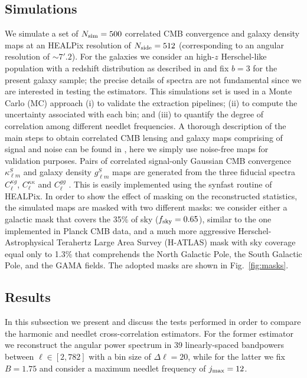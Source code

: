 \documentclass[a4paper,11pt]{article}
\begin{document}
\subsection{Simulations}
\label{sec:sims}
We simulate a set of $N_{\rm sim}=500$ correlated CMB convergence and galaxy density maps at an 
HEALPix resolution of $N_{\rm side} = 512$ (corresponding to an angular resolution of $\sim 7'.2$). 
For the galaxies we consider an high-$z$ Herschel-like 
population with a redshift distribution as described in \cite{Bianchini2016} and fix $b=3$ for the present 
galaxy sample; the precise details of spectra are not fundamental since we are interested in testing the 
estimators. This simulations set is used in a Monte Carlo (MC) 
approach (i) to validate the extraction pipelines; (ii) to compute the uncertainty associated with each bin; 
and (iii) to quantify the degree of correlation among different needlet frequencies. A thorough description 
of the main steps to obtain correlated CMB lensing and galaxy maps comprising of signal and noise can 
be found in \cite{Bianchini2015}, here we simply use noise-free maps for validation purposes. 
Pairs of correlated signal-only Gaussian CMB convergence $\kappa^S_{\ell m}$ and galaxy density 
$g^S_{\ell m}$ maps are generated from the three fiducial spectra $C^{\kappa g}_{\ell}$, $C^{\kappa
\kappa}_{\ell}$ and $C^{gg}_{\ell}$ \cite{Giannantonio2008,Bianchini2015}. This is easily implemented 
using the synfast routine of HEALPix.
In order to show the effect of masking on the reconstructed statistics, the simulated maps are
masked with two different masks: we consider either a galactic mask that covers the 35\% of sky 
($f_{\rm sky} = 0.65$), similar to the one implemented in Planck CMB data, and a much more 
aggressive Herschel-Astrophysical Terahertz Large Area Survey (H-ATLAS) \cite{Eales2010a} mask with 
sky coverage equal only to 1.3\% that comprehends the North Galactic Pole, the South Galactic Pole, and 
the GAMA fields. The adopted masks are shown in Fig.~\ref{fig:masks}.

\subsection{Results}
\label{sec:results}

In this subsection we present and discuss the tests performed in order to compare the harmonic and needlet cross-correlation estimators. For the former estimator we reconstruct the angular power spectrum in 39 linearly-spaced bandpowers between $\ell \in [2,782]$ with a bin size of $\Delta\ell=20$, while for the latter we fix $B=1.75$ and consider a maximum needlet frequency of $j_{\rm max}=12$.
\end{document}

